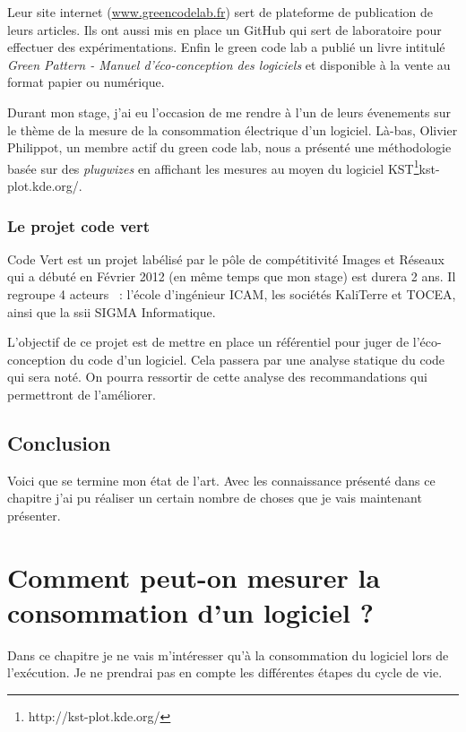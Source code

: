 \documentclass[a4paper, 11pt]{report}
\begin{document}
Leur site internet (\href{http://www.greencodelab.fr}{www.greencodelab.fr}) sert de plateforme de publication de leurs articles. Ils ont aussi mis en place un GitHub qui sert de laboratoire pour effectuer des expérimentations. Enfin le green code lab a publié un livre intitulé \textit{Green Pattern - Manuel d'éco-conception des logiciels} et disponible à la vente au format papier ou numérique.

Durant mon stage, j'ai eu l'occasion de me rendre à l'un de leurs évenements sur le thème de la mesure de la consommation électrique d'un logiciel. Là-bas, Olivier Philippot, un membre actif du green code lab, nous a présenté une méthodologie basée sur des \textit{plugwizes} en affichant les mesures au moyen du logiciel KST\footnote{http://kst-plot.kde.org/}{kst-plot.kde.org/}.
		\subsection{Le projet code vert}
Code Vert est un projet labélisé par le pôle de compétitivité Images et Réseaux qui a débuté en Février 2012 (en même temps que mon stage) est durera 2 ans. Il regroupe 4 acteurs ~: l'école d'ingénieur ICAM, les sociétés KaliTerre et TOCEA, ainsi que la ssii SIGMA Informatique.

L'objectif de ce projet est de mettre en place un référentiel pour juger de l'éco-conception du code d'un logiciel. Cela passera par une analyse statique du code qui sera noté. On pourra ressortir de cette analyse des recommandations qui permettront de l'améliorer.
		
	\section{Conclusion}
Voici que se termine mon état de l'art. Avec les connaissance présenté dans ce chapitre j'ai pu réaliser un certain nombre de choses que je vais maintenant présenter.

\chapter{Comment peut-on mesurer la consommation d'un logiciel ?}
Dans ce chapitre je ne vais m'intéresser qu'à la consommation du logiciel lors de l'exécution. Je ne prendrai pas en compte les différentes étapes du cycle de vie.
\end{document}
